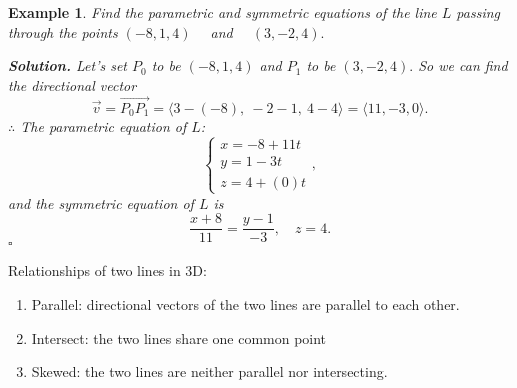 \documentclass[12pt,a4paper]{article}
\newtheorem{eg}{Example}[subsection]
\newenvironment*{sol}{\par\indent\textbf{Solution. }}{\hfill{$\square$}\par}
\def\vecv{\vec{v}}
\begin{document}
\begin{eg}
	Find the parametric and symmetric equations of the line $L$ passing through the points $(-8,1,4)\quad$ and $\quad (3,-2,4).$
	\begin{sol}
		Let's set $P_0$ to be $(-8,1,4)$ and $P_1$ to be $(3,-2,4).$ So we can find the directional vector \[\vecv=\overrightarrow{P_0P_1}=\langle3-(-8),\ -2-1,\ 4-4\rangle=\langle11,-3,0\rangle.\]
		$\therefore$ The parametric equation of $L$: \[\begin{cases}x=-8+11t\\y=1-3t\\z=4+(0)t\end{cases}, \]
		and the symmetric equation of $L$ is \[\frac{x+8}{11}=\frac{y-1}{-3},\quad z=4.\]
	\end{sol}
\end{eg}
Relationships of two lines in 3D: 
\begin{enumerate}
	\item Parallel: directional vectors of the two lines are parallel to each other.
	\item Intersect: the two lines share one common point
	\item Skewed: the two lines are neither parallel nor intersecting. 
\end{enumerate}
\end{document}
